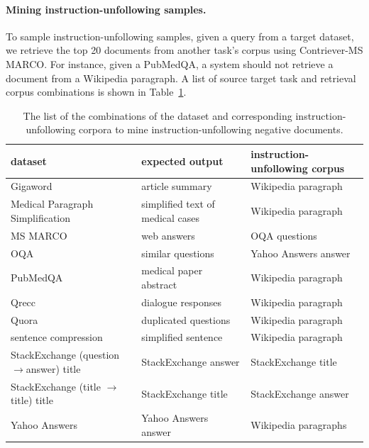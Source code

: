 \paragraph{Mining instruction-unfollowing samples.}
To sample instruction-unfollowing samples, given a query from a target dataset, we retrieve the top 20 documents from another task's corpus using Contriever-MS MARCO. For instance, given a PubMedQA, a system should not retrieve a document from a Wikipedia paragraph. 
A list of source target task and retrieval corpus combinations is shown in  Table~\ref{tab:inst_unfollowing_list}.

\begin{table}[t!]
\footnotesize
    \centering
    \begin{tabular}{lll}%
\toprule
dataset & expected output &instruction-unfollowing corpus\\
\midrule
Gigaword & article summary &Wikipedia paragraph \\
Medical Paragraph Simplification & simplified text of medical cases &Wikipedia paragraph \\
MS MARCO & web answers & OQA questions \\
OQA & similar questions & Yahoo Answers answer \\
PubMedQA & medical paper abstract & Wikipedia paragraph \\
Qrecc & dialogue responses &Wikipedia paragraph \\
Quora & duplicated questions &Wikipedia paragraph \\
sentence compression & simplified sentence & Wikipedia paragraph \\
StackExchange (question$\rightarrow$answer) title &StackExchange answer & StackExchange title \\
StackExchange (title $\rightarrow$title) title & StackExchange title & StackExchange answer \\
Yahoo Answers & Yahoo Answers answer & Wikipedia paragraphs \\
\bottomrule
 \end{tabular}
    \caption{The list of the combinations of the dataset and corresponding {instruction-unfollowing} corpora to mine instruction-unfollowing negative documents. }\label{tab:inst_unfollowing_list}
\end{table}


